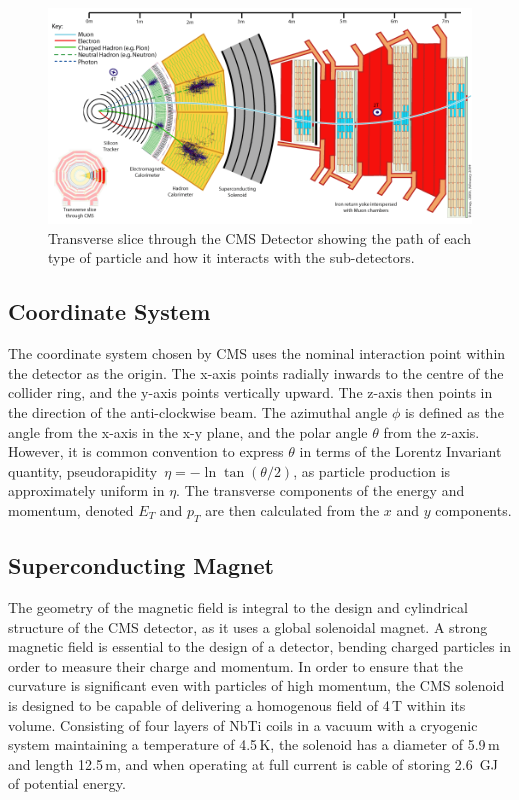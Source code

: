 \begin{figure}
\centering
\includegraphics[width=1.\textwidth]{Figures/Detector/CMS_Slice}
\caption{Transverse slice through the CMS Detector showing the path of each type of particle and how it interacts with the sub-detectors.}
\label{fig:CMS_Slice}
\end{figure}
\subsection{Coordinate System}

The coordinate system chosen by CMS uses the nominal interaction point within the detector as the origin. The x-axis points radially inwards to the centre of the collider ring, and the y-axis points vertically upward. The z-axis then points in the direction of the anti-clockwise beam. The azimuthal angle $\phi$ is defined as the angle from the x-axis in the x-y plane, and the polar angle $\theta$ from the z-axis. However, it is common convention to express $\theta$ in terms of the Lorentz Invariant quantity, pseudorapidity~\begin{math}
\eta = -\ln \tan (\theta / 2) 
\end{math}, as particle production is approximately uniform in $\eta$. The transverse components of the energy and momentum, denoted $E_{T}$ and $p_{T}$ are then calculated from the $x$ and $y$ components. 



\subsection{Superconducting Magnet}

The geometry of the magnetic field is integral to the design and cylindrical structure of the CMS detector, as it uses a global solenoidal magnet. A strong magnetic field is essential to the design of a detector, bending charged particles in order to measure their charge and momentum. In order to ensure that the curvature is significant even with particles of high momentum, the CMS solenoid is designed to be capable of delivering a homogenous field of 4\,T within its volume. Consisting of four layers of NbTi coils in a vacuum with a cryogenic system maintaining a temperature of 4.5\,K, the solenoid has a diameter of 5.9\,m and length 12.5\,m, and when operating at full current is cable of storing 2.6~GJ of potential energy.

